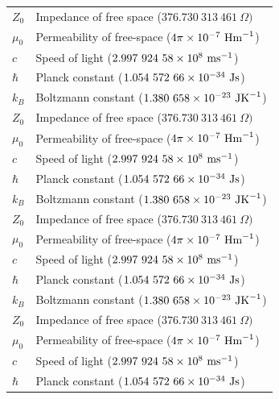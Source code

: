 \begin{xltabular}{\textwidth}{@{}l X@{}}
    $Z_0$   & Impedance of free space  ($376.730\ 313\ 461\ \Omega) $    \\
    $\mu_0$ & Permeability of free-space ($4\pi\e{-7}\ \mbox{Hm}^{-1}$)  \\
    $c$     & Speed of light ($2.997\ 924\ 58 \e{8}\ \mbox{ms}^{-1}$)    \\
    $\hbar$ & Planck constant ($1.054\ 572\ 66\e{-34}\ \mbox{Js}$)       \\
    $k_B$   & Boltzmann constant  ($1.380\ 658\e{-23}\ \mbox{JK}^{-1} $) \\
    $Z_0$   & Impedance of free space  ($376.730\ 313\ 461\ \Omega) $    \\
    $\mu_0$ & Permeability of free-space ($4\pi\e{-7}\ \mbox{Hm}^{-1}$)  \\
    $c$     & Speed of light ($2.997\ 924\ 58 \e{8}\ \mbox{ms}^{-1}$)    \\
    $\hbar$ & Planck constant ($1.054\ 572\ 66\e{-34}\ \mbox{Js}$)       \\
    $k_B$   & Boltzmann constant  ($1.380\ 658\e{-23}\ \mbox{JK}^{-1} $) \\
    $Z_0$   & Impedance of free space  ($376.730\ 313\ 461\ \Omega) $    \\
    $\mu_0$ & Permeability of free-space ($4\pi\e{-7}\ \mbox{Hm}^{-1}$)  \\
    $c$     & Speed of light ($2.997\ 924\ 58 \e{8}\ \mbox{ms}^{-1}$)    \\
    $\hbar$ & Planck constant ($1.054\ 572\ 66\e{-34}\ \mbox{Js}$)       \\
    $k_B$   & Boltzmann constant  ($1.380\ 658\e{-23}\ \mbox{JK}^{-1} $) \\
    $Z_0$   & Impedance of free space  ($376.730\ 313\ 461\ \Omega) $    \\
    $\mu_0$ & Permeability of free-space ($4\pi\e{-7}\ \mbox{Hm}^{-1}$)  \\
    $c$     & Speed of light ($2.997\ 924\ 58 \e{8}\ \mbox{ms}^{-1}$)    \\
    $\hbar$ & Planck constant ($1.054\ 572\ 66\e{-34}\ \mbox{Js}$)
\end{xltabular}

